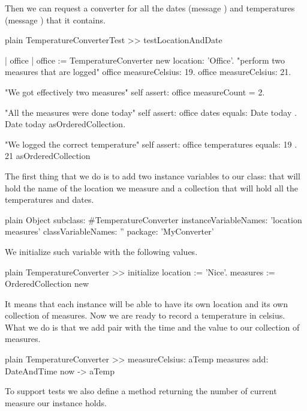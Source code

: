 \documentclass[10pt,twoside,english]{_support/latex/sbabook/sbabook}
\begin{document}
Then we can request a converter for all the dates (message ) and temperatures (message ) that it contains.

\begin{displaycode}{plain}
TemperatureConverterTest >> testLocationAndDate

	| office |
	office := TemperatureConverter new location: 'Office'. 
	"perform two measures that are logged"
	office measureCelsius: 19.
	office measureCelsius: 21.
	
	"We got effectively two measures"
	self assert: office measureCount = 2.
	
	"All the measures were done today"
	self assert: office dates equals: {Date today . Date today} asOrderedCollection.
	
	"We logged the correct temperature"
	self assert: office temperatures equals: { 19 . 21 } asOrderedCollection
\end{displaycode}

The first thing that we do is to add two instance variables to our class:  that will hold the name of the location we measure and  a collection that will hold all the temperatures and dates.

\begin{displaycode}{plain}
Object subclass: #TemperatureConverter
	instanceVariableNames: 'location measures'
	classVariableNames: ''
	package: 'MyConverter'
\end{displaycode}

We initialize such variable with the following values. 

\begin{displaycode}{plain}
TemperatureConverter >> initialize
	location := 'Nice'.
	measures := OrderedCollection new
\end{displaycode}

It means that each instance will be able to have its own location and its own collection of measures. Now we are ready to record a temperature in celsius. 
What we do is that we add pair with the time and the value to our collection of measures. 

\begin{displaycode}{plain}
TemperatureConverter >> measureCelsius: aTemp
	measures add: DateAndTime now -> aTemp
\end{displaycode}

To support tests we also define a method returning the number of current measure our instance holds. 
\end{document}
